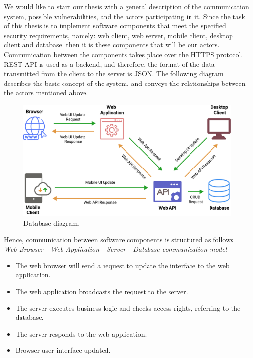 We would like to start our thesis with a general description of the communication system, possible vulnerabilities, and the actors participating in it.
Since the task of this thesis is to implement software components that meet the specified security requirements,
namely: web client, web server, mobile client, desktop client and database, then it is these components that will be our
actors.
Communication between the components takes place over the HTTPS protocol.
REST API is used as a backend, and therefore, the format of the data transmitted from the client to the server is JSON\@.
The following diagram describes the basic concept of the system, and conveys the relationships between the actors mentioned above.

\begin{figure}[H]
    \centering
    \includegraphics[width=1\textwidth]{Pictures/Threat_Modeling}
    \caption{Database diagram.}\label{fig:figure6}
\end{figure}

Hence, communication between software components is structured as follows\\

\textit{Web Browser - Web Application - Server - Database communication model}
\begin{itemize}
    \item The web browser will send a request to update the interface to the web application.
    \item The web application broadcasts the request to the server.
    \item The server executes business logic and checks access rights, referring to the database.
    \item The server responds to the web application.
    \item Browser user interface updated.
\end{itemize}

